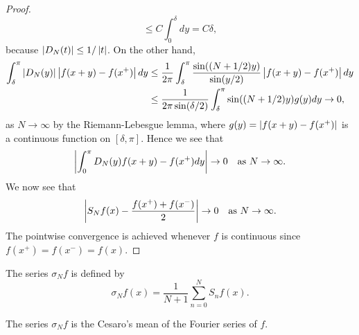 \begin{proof}
\begin{equation*}
        \leq C\int_0^\delta dy = C\delta, 
    \end{equation*}
    because $\left\lvert {D_N(t)} \right\rvert\leq 1/\left\lvert {t} \right\rvert$. On the other hand, 
    \begin{equation*}
        \begin{split}
            \int_\delta^\pi \left\lvert {D_N(y)} \right\rvert\left\lvert {f(x+y)-f(x^+)} \right\rvert dy 
            &\leq \frac{1}{2\pi}\int_\delta^\pi \frac{\sin((N+1/2)y)}{\sin(y/2)}\left\lvert {f(x+y)-f(x^+)} \right\rvert dy \\
            &\leq \frac{1}{2\pi\sin(\delta/2)}\int_\delta^\pi \sin((N+1/2)y)g(y)dy \to 0,
        \end{split}
    \end{equation*}
    as $N\to\infty$ by the Riemann-Lebesgue lemma, where $g(y) = \left\lvert {f(x+y)-f(x^+)} \right\rvert$ 
    is a continuous function on $[\delta,\pi]$. Hence we see that 
    \begin{equation*}
        \left\lvert {\int_0^\pi D_N(y)f(x+y)-f(x^+)dy} \right\rvert \to 0 \quad \text{as } N\to\infty.
    \end{equation*}
    We now see that 
    \begin{equation*}
        \left\lvert {S_Nf(x) - \frac{f(x^+)+f(x^-)}{2}} \right\rvert \to 0 \quad \text{as } N\to\infty.
    \end{equation*}
    The pointwise convergence is achieved whenever $f$ is continuous since 
    $f(x^+)=f(x^-)=f(x)$.
\end{proof}

\begin{definition}
    The series $\sigma_Nf$ is defined by 
    \begin{equation*}
        \sigma_Nf(x) = \frac{1}{N+1}\sum_{n=0}^{N} S_nf(x).
    \end{equation*}
\end{definition}
\begin{remark}
    The series $\sigma_Nf$ is the Cesaro's mean of the Fourier series of $f$.
\end{remark}

